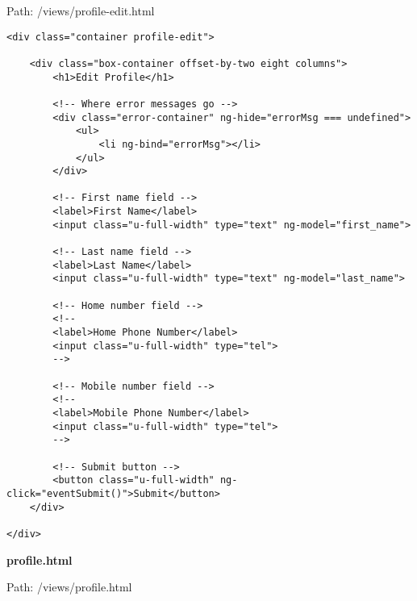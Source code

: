 Path: /views/profile-edit.html

{\scriptsize
\begin{lstlisting}
<div class="container profile-edit">

	<div class="box-container offset-by-two eight columns">
		<h1>Edit Profile</h1>

		<!-- Where error messages go -->
		<div class="error-container" ng-hide="errorMsg === undefined">
			<ul>
				<li ng-bind="errorMsg"></li>
			</ul>
		</div>

		<!-- First name field -->
		<label>First Name</label>
		<input class="u-full-width" type="text" ng-model="first_name">

		<!-- Last name field -->
		<label>Last Name</label>
		<input class="u-full-width" type="text" ng-model="last_name">

		<!-- Home number field -->
		<!--
		<label>Home Phone Number</label>
		<input class="u-full-width" type="tel">
		-->

		<!-- Mobile number field -->
		<!--
		<label>Mobile Phone Number</label>
		<input class="u-full-width" type="tel">
		-->

		<!-- Submit button -->
		<button class="u-full-width" ng-click="eventSubmit()">Submit</button>
	</div>

</div>\end{lstlisting}
}
\textbf{profile.html}\label{profile.html}

Path: /views/profile.html

